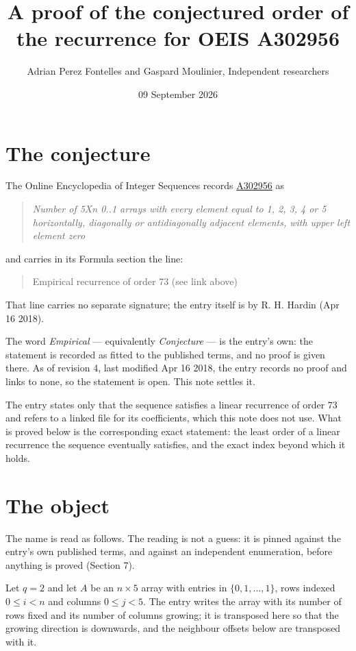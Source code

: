 \documentclass[11pt]{article}
\title{A proof of the conjectured order of the recurrence for OEIS A302956}
\author{Adrian Perez Fontelles and Gaspard Moulinier, Independent researchers}
\date{09 September 2026}
\theoremstyle{definition}
\begin{document}
\maketitle
\section{The conjecture}

The Online Encyclopedia of Integer Sequences records \href{https://oeis.org/A302956}{A302956} as

\begin{quote}\itshape Number of 5Xn 0..1 arrays with every element equal to 1, 2, 3, 4 or 5 horizontally, diagonally or antidiagonally adjacent elements, with upper left element zero\end{quote}

and carries in its Formula section the line:

\begin{quote}\ttfamily Empirical recurrence of order 73 (see link above)\end{quote}

That line carries no separate signature; the entry itself is by R. H. Hardin (Apr 16 2018).

The word {\itshape Empirical} --- equivalently {\itshape Conjecture} --- is the entry's own: the statement is recorded as fitted to the published terms, and no proof is given there. As of revision 4, last modified Apr 16 2018, the entry records no proof and links to none, so the statement is open. This note settles it.

The entry states only that the sequence satisfies a linear recurrence of order $73$ and refers to a linked file for its coefficients, which this note does not use. What is proved below is the corresponding exact statement: the least order of a linear recurrence the sequence eventually satisfies, and the exact index beyond which it holds.

\section{The object}

The name is read as follows. The reading is not a guess: it is pinned against the entry's own published terms, and against an independent enumeration, before anything is proved (Section 7).

Let $q = 2$ and let $A$ be an $n \times 5$ array with entries in $\{0,1,\dots,1\}$, rows indexed $0 \le i < n$ and columns $0 \le j < 5$. The entry writes the array with its number of rows fixed and its number of columns growing; it is transposed here so that the growing direction is downwards, and the neighbour offsets below are transposed with it.
\end{document}
